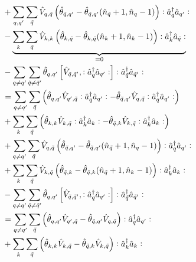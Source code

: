 \begin{appendix}
\begin{itemize}
\begin{align}
&+\Sum_{q,q^\prime}\Sum_{\tilde q} \hat V_{q,\tilde q}\left(\hat\theta_{\tilde q,q^\prime}-\hat\theta_{\tilde q,q^\prime}(\hat n_{\tilde q}+1,\hat n_q-1)\right)\NO\CR_{q}\AN_{q^\prime}\NO\nonumber \\
&-\underbrace{\Sum_{k}\Sum_{\tilde q} \hat V_{k,k}\left(\hat\theta_{k,\tilde q}-\hat\theta_{k,\tilde q}(\hat n_{k}+1,\hat n_k-1)\right)\NO\CR_{k}\AN_{\tilde q}\NO}_{=0}\nonumber \\
&-\Sum_{q\neq q^\prime}\Sum_{\tilde q\neq\tilde q^\prime} \hat\theta_{q,q^\prime}\left[\hat V_{\tilde q,\tilde q^\prime},\NO\CR_q\AN_{q^\prime}\NO\right]\NO\CR_{\tilde q}\AN_{\tilde q^\prime}\NO\nonumber \\
&=\Sum_{q\neq q^\prime}\Sum_{\tilde q} \left(\hat\theta_{q,q^\prime}\hat V_{q^\prime,\tilde q}\NO\CR_{q}\AN_{q^\prime}\NO-\hat\theta_{\tilde q,q^\prime}\hat V_{q,\tilde q}\NO\CR_{q}\AN_{q^\prime}\NO\right) \\
&+\Sum_{k}\Sum_{\tilde q} \left(\hat\theta_{k,k}\hat V_{k,\tilde q}\NO\CR_{k}\AN_{k}\NO-\hat\theta_{\tilde q,k}\hat V_{k,\tilde q}\NO\CR_{k}\AN_{k}\NO\right) \nonumber \\
&+\Sum_{q\neq q^\prime}\Sum_{\tilde q} \hat V_{q,\tilde q}\left(\hat\theta_{\tilde q,q^\prime}-\hat\theta_{\tilde q,q^\prime}(\hat n_{\tilde q}+1,\hat n_q-1)\right)\NO\CR_{q}\AN_{q^\prime}\NO\nonumber \\
&+\Sum_{k}\Sum_{\tilde q} \hat V_{k,\tilde q}\left(\hat\theta_{\tilde q,k}-\hat\theta_{\tilde q,k}(\hat n_{\tilde q}+1,\hat n_k-1)\right)\NO\CR_{k}\AN_{k}\NO\nonumber \\
&-\Sum_{q\neq q^\prime}\Sum_{\tilde q\neq\tilde q^\prime} \hat\theta_{q,q^\prime}\left[\hat V_{\tilde q,\tilde q^\prime},\NO\CR_q\AN_{q^\prime}\NO\right]\NO\CR_{\tilde q}\AN_{\tilde q^\prime}\NO\nonumber \\
&=\Sum_{q\neq q^\prime}\Sum_{\tilde q} \left(\hat\theta_{q,q^\prime}\hat V_{q^\prime,\tilde q}-\hat\theta_{\tilde q,q^\prime}\hat V_{q,\tilde q}\right)\NO\CR_{q}\AN_{q^\prime}\NO \\
&+\Sum_{k}\Sum_{\tilde q} \left(\hat\theta_{k,k}\hat V_{k,\tilde q}-\hat\theta_{\tilde q,k}\hat V_{k,\tilde q}\right)\NO\CR_{k}\AN_{k}\NO \nonumber \\

\end{align}
\end{itemize}
\end{appendix}
